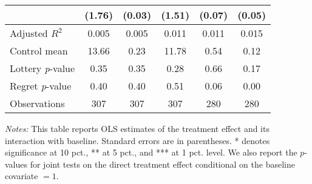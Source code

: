 \begin{table}[h]
{\begin{threeparttable}
\begin{tabular}{l*{5}{c}}
                &   (1.76)         &   (0.03)         &   (1.51)         &   (0.07)         &   (0.05)         \\
\midrule
Adjusted \(R^{2}\)&    0.005         &    0.005         &    0.011         &    0.011         &    0.015         \\
Control mean    &    13.66         &     0.23         &    11.78         &     0.54         &     0.12         \\
Lottery \emph{p}-value&     0.35         &     0.35         &     0.28         &     0.66         &     0.17         \\
Regret \emph{p}-value&     0.40         &     0.40         &     0.51         &     0.06         &     0.00         \\
Observations    &      307         &      307         &      307         &      280         &      280         \\
\bottomrule \end{tabular} \begin{tablenotes}[flushleft] \footnotesize \item \emph{Notes:} This table reports OLS estimates of the treatment effect and its interaction with baseline. Standard errors are in parentheses. * denotes significance at 10 pct., ** at 5 pct., and *** at 1 pct. level. We also report the \(p\)-values for joint tests on the direct treatment effect conditional on the baseline covariate $= 1$. \end{tablenotes} \end{threeparttable} } \end{table}

